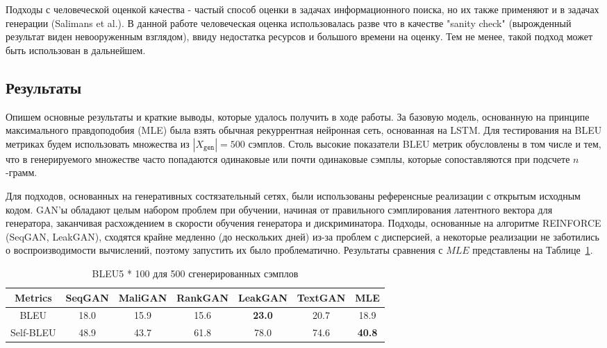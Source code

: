 \documentclass{spbau-diploma}
\begin{document}
Подходы с человеческой оценкой качества - частый способ оценки в задачах 
информационного поиска, но их также применяют и в задачах генерации 
(Salimans et al.\cite{1606.03498}). В данной работе человеческая оценка 
использовалась разве что в качестве "sanity check" (вырожденный результат 
виден невооруженным взглядом), ввиду недостатка ресурсов и большого времени на 
оценку. Тем не менее, такой подход может быть использован в дальнейшем.

\subsection{Результаты}
Опишем основные результаты и краткие выводы, которые удалось получить в ходе 
работы. За базовую модель, основанную на принципе максимального правдоподобия 
(MLE) была взять обычная рекуррентная нейронная сеть, основанная на LSTM. Для 
тестирования на BLEU метриках будем использовать множества из 
$|X_{\texttt{gen}}|=500$ сэмплов. Столь высокие показатели BLEU метрик 
обусловлены в том числе и тем, что в генерируемого множестве часто попадаются 
одинаковые или почти одинаковые сэмплы, которые сопоставляются при подсчете 
$n$-грамм.

Для подходов, основанных на генеративных состязательный сетях, были 
использованы референсные реализации с открытым исходным кодом. GAN'ы обладают 
целым набором проблем при обучении, начиная от правильного сэмплирования 
латентного вектора для генератора, заканчивая расхождением в скорости обучения 
генератора и дискриминатора. Подходы, основанные на алгоритме 
REINFORCE (SeqGAN, LeakGAN), сходятся крайне медленно (до нескольких дней) 
из-за проблем с дисперсией, а некоторые реализации не заботились о 
воспроизводимости вычислений, поэтому запустить их было проблематично. 
Результаты сравнения с $MLE$ представлены на Таблице~\ref{ganmle_table}.

\begin{table}
\begin{tabular}{c | c c c c c c}
\toprule
Metrics & SeqGAN & MaliGAN & RankGAN & LeakGAN & TextGAN & MLE \\
\midrule
BLEU & 18.0 & 15.9 & 15.6 & \textbf{23.0} & 20.7 & 18.9 \\
Self-BLEU & 48.9 & 43.7 & 61.8 & 78.0 & 74.6 & \textbf{40.8} \\
\bottomrule
\end{tabular}
\caption{BLEU5 * 100 для 500 сгенерированных сэмплов}
\label{ganmle_table}
\end{table}
\end{document}
